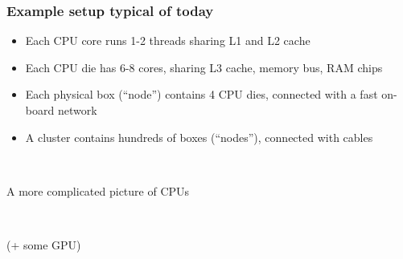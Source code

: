 \documentclass[sans,mathserif]{beamer}
\begin{document}
\begin{frame}
  \frametitle{Example setup typical of today}
    \begin{itemize}
    \item<+-> Each CPU core runs 1-2 threads sharing L1 and L2 cache
    \item<+-> Each CPU die has 6-8 cores, sharing L3 cache, memory bus, RAM chips
    \item<+-> Each physical box (``node'') contains 4 CPU dies, connected with
       a fast on-board network
    \item<+-> A cluster contains hundreds of boxes (``nodes''), connected with cables
    \end{itemize}

~

  
\end{frame}


\begin{frame}
  \begin{center}
    \LARGE A more complicated picture of CPUs

~

(+ some GPU)
  \end{center}
\end{frame}
\end{document}

